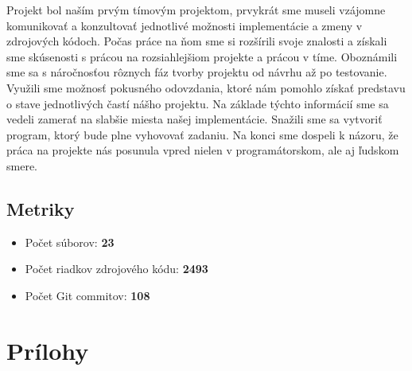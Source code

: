 \documentclass[11pt,a4paper]{article}
\begin{document}
Projekt bol naším prvým tímovým projektom, prvykrát sme museli vzájomne komunikovať a konzultovať jednotlivé možnosti implementácie a zmeny v zdrojových kódoch. Počas práce na ňom sme si rozšírili svoje znalosti a získali sme skúsenosti s prácou na rozsiahlejšiom projekte a prácou v tíme. Oboznámili sme sa s náročnosťou rôznych fáz tvorby projektu od návrhu až po testovanie. Využili sme možnosť pokusného odovzdania, ktoré nám pomohlo získať predstavu o stave jednotlivých častí nášho projektu. Na základe týchto informácií sme sa vedeli zamerať na slabšie miesta našej implementácie. Snažili sme sa vytvoriť program, ktorý bude plne vyhovovať zadaniu. Na konci sme dospeli k názoru, že práca na projekte nás posunula vpred nielen v programátorskom, ale aj ľudskom smere.

	\subsection{Metriky}
	\begin{itemize}
		\item 	Počet súborov: \textbf{23}
		\item 	Počet riadkov zdrojového kódu: \textbf{2493}
		\item 	Počet Git commitov: \textbf{108}
	\end{itemize}
\newpage
\section{Prílohy}
	
\end{document}
